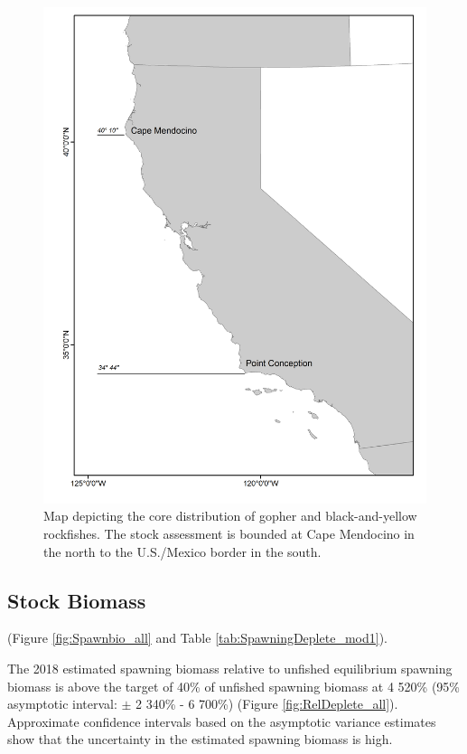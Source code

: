 \documentclass[12pt,]{article}
\begin{document}
\begin{figure}
\centering
\includegraphics{Figures/assess_region_map.png}
\caption{Map depicting the core distribution of gopher and
black-and-yellow rockfishes. The stock assessment is bounded at Cape
Mendocino in the north to the U.S./Mexico border in the south.
\label{fig:assess_region_map}}
\end{figure}

\FloatBarrier

\subsection*{Stock Biomass}\label{stock-biomass}

(Figure \ref{fig:Spawnbio_all} and Table
\ref{tab:SpawningDeplete_mod1}).

The 2018 estimated spawning biomass relative to unfished equilibrium
spawning biomass is above the target of 40\% of unfished spawning
biomass at 4 520\% (95\% asymptotic interval: \(\pm\) 2 340\% - 6 700\%)
(Figure \ref{fig:RelDeplete_all}). Approximate confidence intervals
based on the asymptotic variance estimates show that the uncertainty in
the estimated spawning biomass is high.
\end{document}
